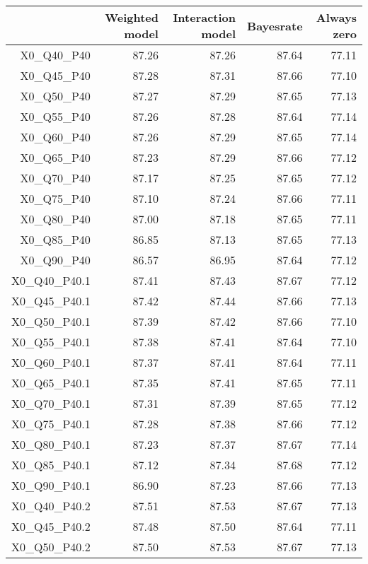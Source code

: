 \begin{table}[ht]
\centering
\begin{tabular}{rrrrr}
  \hline
 & Weighted model & Interaction model & Bayesrate & Always zero \\ 
  \hline
X0\_Q40\_P40 & 87.26 & 87.26 & 87.64 & 77.11 \\ 
  X0\_Q45\_P40 & 87.28 & 87.31 & 87.66 & 77.10 \\ 
  X0\_Q50\_P40 & 87.27 & 87.29 & 87.65 & 77.13 \\ 
  X0\_Q55\_P40 & 87.26 & 87.28 & 87.64 & 77.14 \\ 
  X0\_Q60\_P40 & 87.26 & 87.29 & 87.65 & 77.14 \\ 
  X0\_Q65\_P40 & 87.23 & 87.29 & 87.66 & 77.12 \\ 
  X0\_Q70\_P40 & 87.17 & 87.25 & 87.65 & 77.12 \\ 
  X0\_Q75\_P40 & 87.10 & 87.24 & 87.66 & 77.11 \\ 
  X0\_Q80\_P40 & 87.00 & 87.18 & 87.65 & 77.11 \\ 
  X0\_Q85\_P40 & 86.85 & 87.13 & 87.65 & 77.13 \\ 
  X0\_Q90\_P40 & 86.57 & 86.95 & 87.64 & 77.12 \\ 
  X0\_Q40\_P40.1 & 87.41 & 87.43 & 87.67 & 77.12 \\ 
  X0\_Q45\_P40.1 & 87.42 & 87.44 & 87.66 & 77.13 \\ 
  X0\_Q50\_P40.1 & 87.39 & 87.42 & 87.66 & 77.10 \\ 
  X0\_Q55\_P40.1 & 87.38 & 87.41 & 87.64 & 77.10 \\ 
  X0\_Q60\_P40.1 & 87.37 & 87.41 & 87.64 & 77.11 \\ 
  X0\_Q65\_P40.1 & 87.35 & 87.41 & 87.65 & 77.11 \\ 
  X0\_Q70\_P40.1 & 87.31 & 87.39 & 87.65 & 77.12 \\ 
  X0\_Q75\_P40.1 & 87.28 & 87.38 & 87.66 & 77.12 \\ 
  X0\_Q80\_P40.1 & 87.23 & 87.37 & 87.67 & 77.14 \\ 
  X0\_Q85\_P40.1 & 87.12 & 87.34 & 87.68 & 77.12 \\ 
  X0\_Q90\_P40.1 & 86.90 & 87.23 & 87.66 & 77.13 \\ 
  X0\_Q40\_P40.2 & 87.51 & 87.53 & 87.67 & 77.13 \\ 
  X0\_Q45\_P40.2 & 87.48 & 87.50 & 87.64 & 77.11 \\ 
  X0\_Q50\_P40.2 & 87.50 & 87.53 & 87.67 & 77.13 \\ 

\end{tabular}
\end{table}
